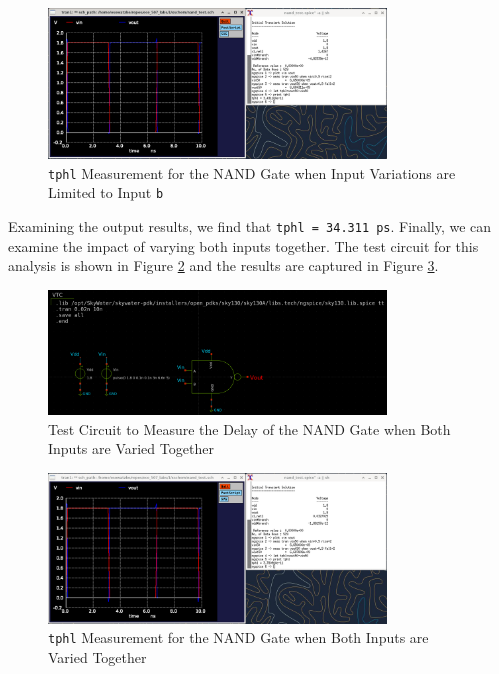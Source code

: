 \documentclass[fleqn]{article}
\begin{document}
	\begin{figure}[H]
		\centerline{\includegraphics[width=0.8\textwidth]{nand_delay_sweep_vb.png}}
		\caption{\texttt{tphl} Measurement for the NAND Gate when Input Variations are Limited to Input \texttt{b}}
		\label{fig::nand_delay_sweep_vb}
	\end{figure}
	
	Examining the output results, we find that \texttt{tphl = 34.311 ps}. Finally, we can examine the impact of varying both inputs together. The test circuit for this analysis is shown in Figure  \ref{fig::nand_delay_test_sweep_va_vb} and the results are captured in Figure  \ref{fig::nand_delay_sweep_va_vb}.
	
	\begin{figure}[H]
		\centerline{\includegraphics[width=0.8\textwidth]{nand_delay_test_sweep_va_vb.png}}
		\caption{Test Circuit to Measure the Delay of the NAND Gate when Both Inputs are Varied Together}
		\label{fig::nand_delay_test_sweep_va_vb}
	\end{figure}
	
	\begin{figure}[H]
		\centerline{\includegraphics[width=0.8\textwidth]{nand_delay_sweep_va_vb.png}}
		\caption{\texttt{tphl} Measurement for the NAND Gate when Both Inputs are Varied Together}
		\label{fig::nand_delay_sweep_va_vb}
	\end{figure}
	
\end{document}
